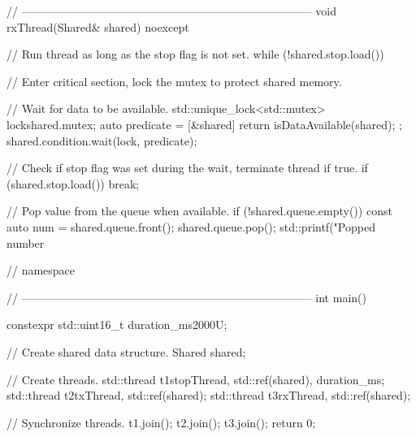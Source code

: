 \begin{cppcode}
{// -----------------------------------------------------------------------------
void rxThread(Shared& shared) noexcept
{
    // Run thread as long as the stop flag is not set.
    while (!shared.stop.load())
    {
        // Enter critical section, lock the mutex to protect shared memory.
        {
            // Wait for data to be available.
            std::unique_lock<std::mutex> lock{shared.mutex};
            auto predicate = [&shared] { return isDataAvailable(shared); };
            shared.condition.wait(lock, predicate);

            // Check if stop flag was set during the wait, terminate thread if true.
            if (shared.stop.load()) { break; }

            // Pop value from the queue when available.
            if (!shared.queue.empty())
            {
                const auto num = shared.queue.front();
                shared.queue.pop();
                std::printf("Popped number %
            }
        }
    }
}
} // namespace

// -----------------------------------------------------------------------------
int main()
{
    constexpr std::uint16_t duration_ms{2000U};

    // Create shared data structure.
    Shared shared{};

    // Create threads.
    std::thread t1{stopThread, std::ref(shared), duration_ms};
    std::thread t2{txThread, std::ref(shared)};
    std::thread t3{rxThread, std::ref(shared)};

    // Synchronize threads.
    t1.join();
    t2.join();
    t3.join();
    return 0;
}
\end{cppcode}

